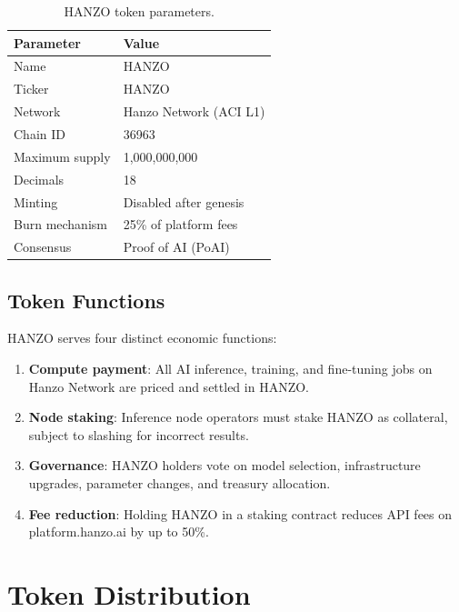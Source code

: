 \documentclass[11pt]{article}
\begin{document}
\begin{table}[H]
\centering
\small
\begin{tabular}{ll}
\toprule
\textbf{Parameter} & \textbf{Value} \\
\midrule
Name & HANZO \\
Ticker & HANZO \\
Network & Hanzo Network (ACI L1) \\
Chain ID & 36963 \\
Maximum supply & 1,000,000,000 \\
Decimals & 18 \\
Minting & Disabled after genesis \\
Burn mechanism & 25\% of platform fees \\
Consensus & Proof of AI (PoAI) \\
\bottomrule
\end{tabular}
\caption{HANZO token parameters.}
\label{tab:params}
\end{table}

\subsection{Token Functions}

HANZO serves four distinct economic functions:

\begin{enumerate}[leftmargin=1.4em]
    \item \textbf{Compute payment}: All AI inference, training, and fine-tuning
    jobs on Hanzo Network are priced and settled in HANZO.
    \item \textbf{Node staking}: Inference node operators must stake HANZO as
    collateral, subject to slashing for incorrect results.
    \item \textbf{Governance}: HANZO holders vote on model selection,
    infrastructure upgrades, parameter changes, and treasury allocation.
    \item \textbf{Fee reduction}: Holding HANZO in a staking contract reduces
    API fees on platform.hanzo.ai by up to 50\%.
\end{enumerate}

\section{Token Distribution}
\label{sec:distribution}
\end{document}
